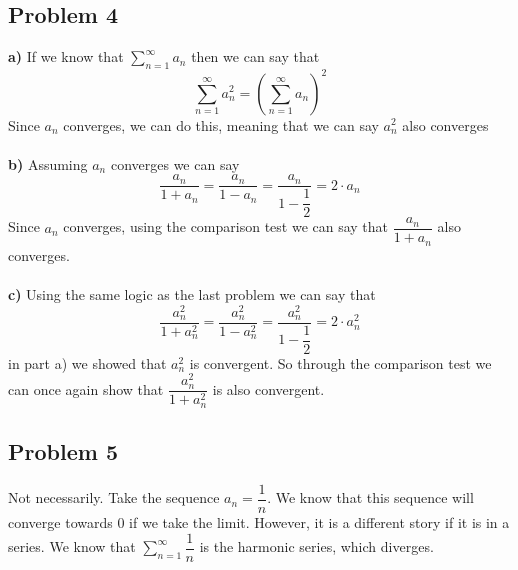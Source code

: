 \documentclass[12pt]{article}
\begin{document}
\subsection*{Problem 4}
\textbf{a) } If we know that $\sum^{\infty}_{n = 1}a_n$ then we can say that
\[ \sum^{\infty}_{n = 1}a^2_n = \left(  \sum^{\infty}_{n = 1}a_n \right)^2 \]
Since $a_n$ converges, we can do this, meaning that we can say $a_n^2$ also converges\\\\
\textbf{b) } Assuming $a_n$ converges we can say
\[ \dfrac{a_n}{1+ a_n} = \dfrac{a_n}{1 - a_n} = \dfrac{a_n}{1 - \dfrac{1}{2}} = 2 \cdot a_n\]
Since $a_n$ converges, using the comparison test we can say that $\dfrac{a_n}{1 + a_n}$ also converges. \\\\
\textbf{c)} Using the same logic as the last problem we can say that
\[ \dfrac{a^2_n}{1+ a^2_n} = \dfrac{a^2_n}{1 - a^2_n} = \dfrac{a^2_n}{1 - \dfrac{1}{2}} = 2 \cdot a_n^2 \]
in part a) we showed that $a_n^2$ is convergent. So through the comparison test we can once again show that $\dfrac{a^2_n}{1+ a^2_n}$ is also convergent. 
\subsection*{Problem 5}
Not necessarily. Take the sequence $a_n = \dfrac{1}{n}$. We know that this sequence will converge towards 0 if we take the limit. However, it is a different story if it is in a series. We know that $\sum_{n = 1}^{\infty} \dfrac{1}{n}$ is the harmonic series, which diverges.
\end{document}
